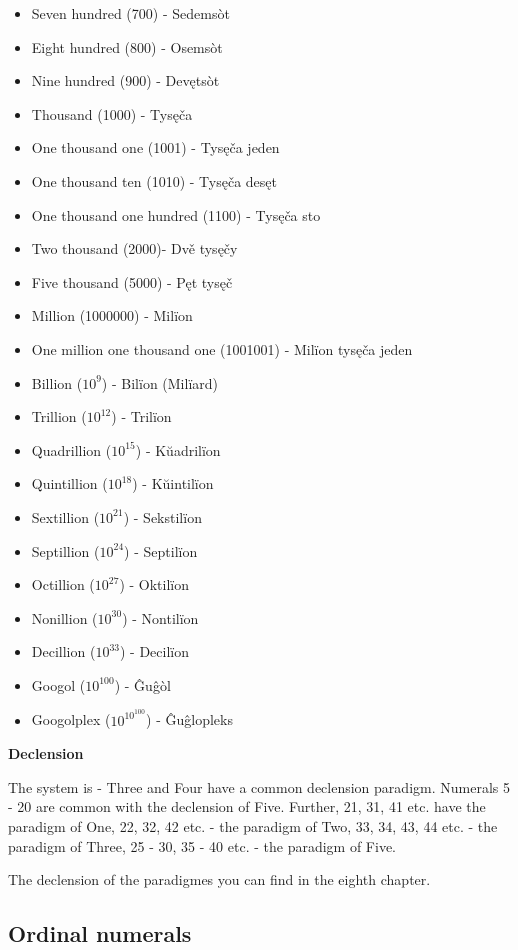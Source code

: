 \begin{itemize}
	\item Seven hundred (700) - Sedemsòt
	\item Eight hundred (800) - Osemsòt
	\item Nine hundred (900) - Devętsòt
	\item Thousand (1000) - Tysęča
	\item One thousand one (1001) - Tysęča jeden
	\item One thousand ten (1010) - Tysęča desęt
	\item One thousand one hundred (1100) - Tysęča sto
	\item Two thousand (2000)- Dvě tysęčy
	\item Five thousand (5000) - Pęt tysęč
	\item Million (1000000) - Milïon
	\item One million one thousand one (1001001) - Milïon tysęča jeden
	\item Billion ($10^9$) - Bilïon (Milïard)
	\item Trillion ($10^{12}$) - Trilïon
	\item Quadrillion ($10^{15}$) - Kŭadrilïon
	\item Quintillion ($10^{18}$) - Kŭintilïon
	\item Sextillion ($10^{21}$) - Sekstilïon
	\item Septillion ($10^{24}$) - Septilïon
	\item Octillion ($10^{27}$) - Oktilïon
	\item Nonillion ($10^{30}$) - Nontilïon
	\item Decillion ($10^{33}$) - Decilïon
	\item Googol ($10^{100}$) - Ĝuĝòl
	\item Googolplex ($10^{10^{100}}$) - Ĝuĝlopleks
\end{itemize}

\textbf{Declension}

The system is - Three and Four have a common declension paradigm. Numerals 5 - 20 are common with the declension of Five. Further, 21, 31, 41 etc. have the paradigm of One, 22, 32, 42 etc. - the paradigm of Two, 33, 34, 43, 44 etc. - the paradigm of Three, 25 - 30, 35 - 40 etc. - the paradigm of Five.

The declension of the paradigmes you can find in the eighth chapter.

\subsection{Ordinal numerals}

